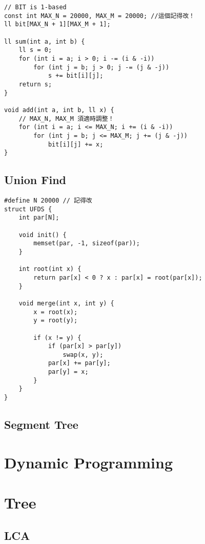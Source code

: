 \documentclass[10pt,oneside]{article}
\begin{document}
\begin{landscape}
\begin{multicols}{2}
\begin{lstlisting}
// BIT is 1-based
const int MAX_N = 20000, MAX_M = 20000; //這個記得改！
ll bit[MAX_N + 1][MAX_M + 1];

ll sum(int a, int b) {
    ll s = 0;
    for (int i = a; i > 0; i -= (i & -i))
        for (int j = b; j > 0; j -= (j & -j))
            s += bit[i][j];
    return s;
}

void add(int a, int b, ll x) {
	// MAX_N, MAX_M 須適時調整！
    for (int i = a; i <= MAX_N; i += (i & -i))
        for (int j = b; j <= MAX_M; j += (j & -j))
            bit[i][j] += x;
}
\end{lstlisting}

\subsection{Union Find}

\begin{lstlisting}
#define N 20000 // 記得改
struct UFDS {
    int par[N];

    void init() {
        memset(par, -1, sizeof(par));
    }

    int root(int x) {
        return par[x] < 0 ? x : par[x] = root(par[x]);
    }

    void merge(int x, int y) {
        x = root(x);
        y = root(y);

        if (x != y) {
            if (par[x] > par[y])
                swap(x, y);
            par[x] += par[y];
            par[y] = x;
        }
    }
}
\end{lstlisting}

\subsection{Segment Tree}


\section{Dynamic Programming}


\section{Tree}

\subsection{LCA}


\end{multicols}
\end{landscape}
\end{document}
